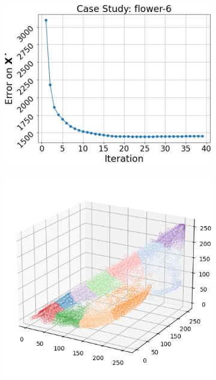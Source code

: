 \begin{figure}[htbp]
\begin{subfigure}[t]{0.32\textwidth}
    \end{subfigure}
    \begin{subfigure}[t]{0.32\textwidth}
        \includegraphics[width=\linewidth]{../../python_code/plots/kmeans/flower-6/elbow_curve.png}
    \end{subfigure}
    \begin{subfigure}[t]{0.32\textwidth}
        \includegraphics[width=\linewidth]{../../python_code/plots/kmeans/flower-6/clusters_elev20_azim-60.png}

\end{subfigure}
\end{figure}
